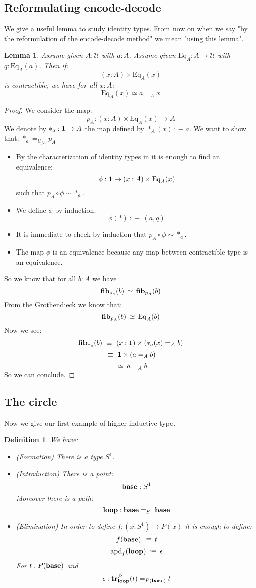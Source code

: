 \documentclass{article}
\newcommand{\sse}[1]{\medbreak \subsection{#1}}
\newcommand{\U}{{\mathcal U}}
\renewcommand{\r}{\rightarrow}
\newcommand{\apd}{\mathrm{apd}}
\newcommand{\tr}{\mathrm{\bf tr}}
\newcommand{\fib}{\mathrm{\bf fib}}
\newcommand{\base}{\mathrm{\bf base}}
\renewcommand{\loop}{\mathrm{\bf loop}}
\newcommand{\one}{{\bf 1}}
\newcommand{\Eq}{\mathrm{Eq}}
\newtheorem{lemma}{Lemma}
\newtheorem{definition}{Definition}
\begin{document}


\sse{Reformulating encode-decode}

We give a useful lemma to study identity types. From now on when we say "by the reformulation of the encode-decode method" we mean "using this lemma". 


\begin{lemma}
Assume given $A:\U$ with $a:A$. Assume given $\Eq_A : A\r \U$ with $q : \Eq_A(a)$. Then if:
\[(x:A)\times \Eq_A(x)\]
is contractible, we have for all $x:A$:
\[\Eq_A(x) \simeq a=_A x\]
\end{lemma}
\begin{proof}
We consider the map: 
\[p_A:(x:A)\times \Eq_A(x)\r A\]
We denote by $*_a : \one \r A$ the map defined by $*_A(x) :\equiv a$. We want to show that:
$*_a=_{\U_{/A}} p_A$
\begin{itemize}
\item By the characterization of identity types in it is enough to find an equivalence:
\[\phi : \one \r (x:A)\times \Eq_A(x)\] 
such that $p_A\circ \phi \sim *_a$.
\item We define $\phi$ by induction:
\[\phi(*) \, :\equiv \, (a,q)\]
\item It is immediate to check by induction that $p_A\circ \phi \sim *_a$.
\item The map $\phi$ is an equivalence because any map between contractible type is an equivalence.
\end{itemize}
So we know that for all $b:A$ we have
\[\fib_{*_a}(b)\, \simeq\, \fib_{p_A}(b)\]
From the Grothendieck we know that:
\[\fib_{p_A}(b) \, \simeq \, \Eq_A(b)\]
Now we see:
\[\fib_{*_a}(b) \ \equiv\  (x:\one)\times (*_a(x)=_Ab) \]
\[\ \equiv\  \one\times (a=_Ab) \]
\[\ \simeq\ a=_Ab\]
So we can conclude.
\end{proof}


\sse{The circle}

Now we give our first example of higher inductive type.

\begin{definition}
We have:
\begin{itemize}
\item (Formation) There is a type $S^1$.
\item (Introduction) There is a point: \[\base : S^1\] 
Moreover there is a path: \[\loop : \base=_{S^1}\base\]
\item (Elimination) In order to define $f:(x:S^1) \r P(x)$ it is enough to define:
\[f(\base) \, :\equiv\, t \]
\[\apd_f(\loop) \, :\equiv\, \epsilon\]
For $t:P(\base)$ and 
\[\epsilon : \tr^P_\loop(t) =_{P(\base)} t\]%
\end{itemize}
\end{definition}
\end{document}

